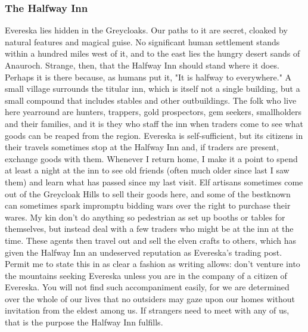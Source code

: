 \documentclass[10pt,a4paper,twoside,twocolumn,openany,bg=print,nodeprecatedcode]{dndbook}
\begin{document}
\subsubsection{The Halfway Inn}
Evereska lies hidden in the Greycloaks. Our paths to it are secret, cloaked by natural features and magical guise. No significant human settlement stands within a hundred miles west of it, and to the east lies the hungry desert sands of Anauroch.
Strange, then, that the Halfway Inn should stand where it does. Perhaps it is there because, as humans put it, "It is halfway to everywhere." A small village surrounds the titular inn, which is itself not a single building, but a small compound that includes stables and other outbuildings. The folk who live here yearround are hunters, trappers, gold prospectors, gem seekers, smallholders and their families, and it is they who staff the inn when traders come to see what goods can be reaped from the region.
Evereska is self-sufficient, but its citizens in their travels sometimes stop at the Halfway Inn and, if traders are present, exchange goods with them. Whenever I return home, I make it a point to spend at least a night at the inn to see old friends (often much older since last I saw them) and learn what has passed since my last visit.
Elf artisans sometimes come out of the Greycloak Hills to sell their goods here, and some of the bestknown can sometimes spark impromptu bidding wars over the right to purchase their wares. My kin don't do anything so pedestrian as set up booths or tables for themselves, but instead deal with a few traders who might be at the inn at the time. These agents then travel out and sell the elven crafts to others, which has given the Halfway Inn an undeserved reputation as Evereska's trading post.
Permit me to state this in as clear a fashion as writing allows: don't venture into the mountains seeking Evereska unless you are in the company of a citizen of Evereska. You will not find such accompaniment easily, for we are determined over the whole of our lives that no outsiders may gaze upon our homes without invitation from the eldest among us. If strangers need to meet with any of us, that is the purpose the Halfway Inn fulfills.
\end{document}
